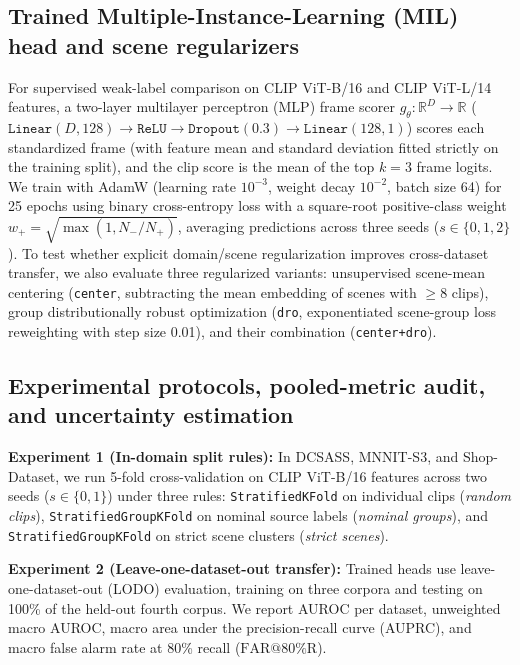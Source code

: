 \documentclass[pdflatex,sn-mathphys-num]{sn-jnl}
\begin{document}
\subsection{Trained Multiple-Instance-Learning (MIL) head and scene regularizers}

For supervised weak-label comparison on CLIP ViT-B/16 and CLIP ViT-L/14 features, a two-layer multilayer perceptron (MLP) frame scorer $g_\theta : \mathbb{R}^D \to \mathbb{R}$ ($\texttt{Linear}(D, 128) \to \texttt{ReLU} \to \texttt{Dropout}(0.3) \to \texttt{Linear}(128, 1)$) scores each standardized frame (with feature mean and standard deviation fitted strictly on the training split), and the clip score is the mean of the top $k=3$ frame logits. We train with AdamW (learning rate $10^{-3}$, weight decay $10^{-2}$, batch size 64) for 25 epochs using binary cross-entropy loss with a square-root positive-class weight $w_+ = \sqrt{\max(1, N_- / N_+)}$, averaging predictions across three seeds ($s \in \{0, 1, 2\}$). To test whether explicit domain/scene regularization improves cross-dataset transfer, we also evaluate three regularized variants: unsupervised scene-mean centering (\texttt{center}, subtracting the mean embedding of scenes with $\ge 8$ clips), group distributionally robust optimization (\texttt{dro}, exponentiated scene-group loss reweighting with step size 0.01), and their combination (\texttt{center+dro}).

\subsection{Experimental protocols, pooled-metric audit, and uncertainty estimation}

\textbf{Experiment 1 (In-domain split rules):} In DCSASS, MNNIT-S3, and Shop-Dataset, we run 5-fold cross-validation on CLIP ViT-B/16 features across two seeds ($s \in \{0, 1\}$) under three rules: \texttt{StratifiedKFold} on individual clips (\emph{random clips}), \texttt{StratifiedGroupKFold} on nominal source labels (\emph{nominal groups}), and \texttt{StratifiedGroupKFold} on strict scene clusters (\emph{strict scenes}).

\textbf{Experiment 2 (Leave-one-dataset-out transfer):} Trained heads use leave-one-dataset-out (LODO) evaluation, training on three corpora and testing on 100\% of the held-out fourth corpus. We report AUROC per dataset, unweighted macro AUROC, macro area under the precision-recall curve (AUPRC), and macro false alarm rate at 80\% recall ($\text{FAR@80\%R}$).
\end{document}
